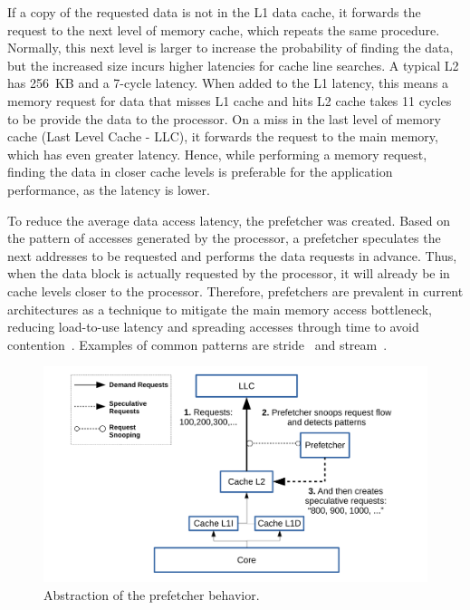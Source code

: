 \documentclass[AMA,final,STIX1COL]{WileyNJD-v2}
\begin{document}
If a copy of the requested data is not in the L1 data cache, it forwards the request to the next level of memory cache, which repeats the same procedure.
Normally, this next level is larger to increase the probability of finding the data, but the increased size incurs higher latencies for cache line searches.
A typical L2 has 256~KB and a 7-cycle latency.
When added to the L1 latency, this means a memory request for data that misses L1 cache and hits L2 cache takes 11 cycles to be provide the data to the processor.
On a miss in the last level of memory cache (Last Level Cache - LLC), it forwards the request to the main memory, which has even greater latency. 
Hence, while performing a memory request, finding the data in closer cache levels is preferable for the application performance, as the latency is lower.

To reduce the average data access latency, the prefetcher was created.
Based on the pattern of accesses generated by the processor, a prefetcher speculates the next addresses to be requested and performs the data requests in advance.
Thus, when the data block is actually requested by the processor, it will already be in cache levels closer to the processor.
Therefore, prefetchers are prevalent in current architectures as a technique to mitigate the main memory access bottleneck, reducing load-to-use latency and spreading accesses through time to avoid contention~\cite{bakhshalipour2019bingo}.
Examples of common patterns are stride~\cite{chen1995effective} and stream~\cite{le2007ibm}.

\begin{figure}[!htb]
    \centering
        \includegraphics[width=.8\textwidth]{figures/figpref-en.pdf}
  \caption{Abstraction of the prefetcher behavior.}
  \label{fig:prefetcher}
\end{figure}
\end{document}
